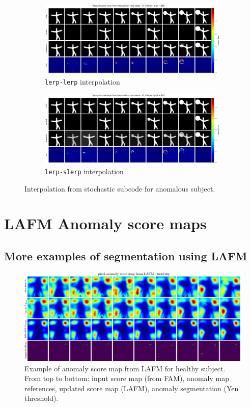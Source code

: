 \begin{figure}[htbp]
  \centering
  \begin{subfigure}{0.8\linewidth}
    \includegraphics[width=\linewidth]{figures/interpolation-lerp-lerp-id-165.pdf}
    \caption{\texttt{lerp-lerp} interpolation}
  \end{subfigure}

  \begin{subfigure}{0.8\linewidth}
    \includegraphics[width=\linewidth]{figures/interpolation-lerp-slerp-id-165.pdf}
    \caption{\texttt{lerp-slerp} interpolation}
  \end{subfigure}
  \caption{Interpolation from stochastic subcode for anomalous subject. }
  \label{fig:interpolation-ano}
\end{figure}

\chapter{LAFM Anomaly score maps}
\section{More examples of segmentation using LAFM}
\begin{figure}[htbp]
  \centering
  \includegraphics[width=0.75\linewidth]{figures/app-lafm-healthy.pdf}
  \caption[Example: anomaly segmentation from LAFM - \texttt{healthy} subject]{Example of anomaly score map from LAFM for healthy subject. From top to bottom: input score map (from FAM), anomaly map references, updated score map (LAFM), anomaly segmentation (Yen threshold).}
\end{figure}

